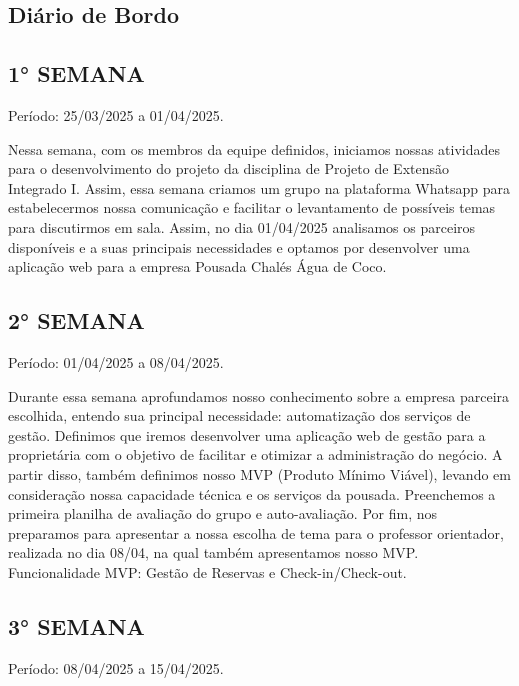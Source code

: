 \documentclass[
	12pt,				%
	openany,			%
	twoside,			%
	a4paper,			%
	english,			%
	french,				%
	spanish,			%
	brazil				%
	]{abntex2}
\begin{document}
\begin{apendicesenv}

\partapendices

\chapter{Diário de Bordo}


\section{1° SEMANA}
Período: 25/03/2025 a 01/04/2025.

Nessa semana, com os membros da equipe definidos, iniciamos nossas atividades para o desenvolvimento do projeto da disciplina de Projeto de Extensão Integrado I. Assim, essa semana criamos um grupo na plataforma Whatsapp para estabelecermos nossa comunicação e facilitar o levantamento de possíveis temas para discutirmos em sala. Assim, no dia 01/04/2025 analisamos os parceiros disponíveis e a suas principais necessidades e optamos por desenvolver uma aplicação web para a empresa Pousada Chalés Água de Coco. 

\section{2° SEMANA}
Período: 01/04/2025 a 08/04/2025.

Durante essa semana aprofundamos nosso conhecimento sobre a empresa parceira escolhida, entendo sua principal necessidade: automatização dos serviços de gestão.
Definimos que iremos desenvolver uma aplicação web de gestão para a proprietária com o objetivo de facilitar e otimizar a administração do negócio. A partir disso, também definimos nosso MVP (Produto Mínimo Viável), levando em consideração nossa capacidade técnica e os serviços da pousada. Preenchemos a primeira planilha de avaliação do grupo e auto-avaliação. Por fim, nos preparamos para apresentar a nossa escolha de tema para o professor orientador, realizada no dia 08/04, na qual também apresentamos nosso MVP.
Funcionalidade MVP: Gestão de Reservas e Check-in/Check-out. 	


\section{3° SEMANA}
Período: 08/04/2025 a 15/04/2025.


\end{apendicesenv}
\end{document}
